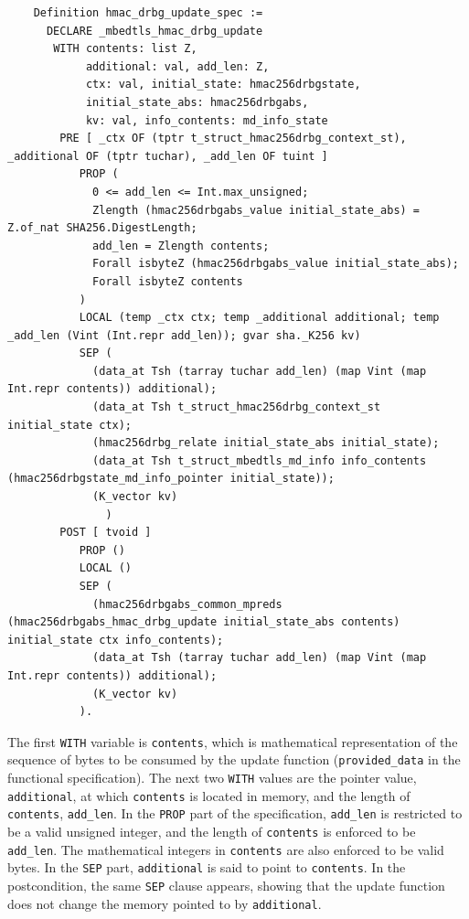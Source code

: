 \documentclass[pageno]{jpaper}
\begin{document}
\begin{lstlisting}
    Definition hmac_drbg_update_spec :=
      DECLARE _mbedtls_hmac_drbg_update
       WITH contents: list Z,
            additional: val, add_len: Z,
            ctx: val, initial_state: hmac256drbgstate,
            initial_state_abs: hmac256drbgabs,
            kv: val, info_contents: md_info_state
        PRE [ _ctx OF (tptr t_struct_hmac256drbg_context_st), _additional OF (tptr tuchar), _add_len OF tuint ]
           PROP (
             0 <= add_len <= Int.max_unsigned;
             Zlength (hmac256drbgabs_value initial_state_abs) = Z.of_nat SHA256.DigestLength;
             add_len = Zlength contents;
             Forall isbyteZ (hmac256drbgabs_value initial_state_abs);
             Forall isbyteZ contents
           )
           LOCAL (temp _ctx ctx; temp _additional additional; temp _add_len (Vint (Int.repr add_len)); gvar sha._K256 kv)
           SEP (
             (data_at Tsh (tarray tuchar add_len) (map Vint (map Int.repr contents)) additional);
             (data_at Tsh t_struct_hmac256drbg_context_st initial_state ctx);
             (hmac256drbg_relate initial_state_abs initial_state);
             (data_at Tsh t_struct_mbedtls_md_info info_contents (hmac256drbgstate_md_info_pointer initial_state));
             (K_vector kv)
               )
        POST [ tvoid ]
           PROP ()
           LOCAL ()
           SEP (
             (hmac256drbgabs_common_mpreds (hmac256drbgabs_hmac_drbg_update initial_state_abs contents) initial_state ctx info_contents);
             (data_at Tsh (tarray tuchar add_len) (map Vint (map Int.repr contents)) additional);
             (K_vector kv)
           ).
\end{lstlisting}


The first \lstinline{WITH} variable is \lstinline{contents}, which is mathematical representation of the sequence of bytes to be consumed by the update function (\lstinline{provided_data} in the functional specification). The next two \lstinline{WITH} values are the pointer value, \lstinline{additional}, at which \lstinline{contents} is located in memory, and the length of \lstinline{contents}, \lstinline{add_len}. In the \lstinline{PROP} part of the specification, \lstinline{add_len} is restricted to be a valid unsigned integer, and the length of \lstinline{contents} is enforced to be \lstinline{add_len}. The mathematical integers in \lstinline{contents} are also enforced to be valid bytes. In the \lstinline{SEP} part, \lstinline{additional} is said to point to \lstinline{contents}. In the postcondition, the same \lstinline{SEP} clause appears, showing that the update function does not change the memory pointed to by \lstinline{additional}.
\end{document}
